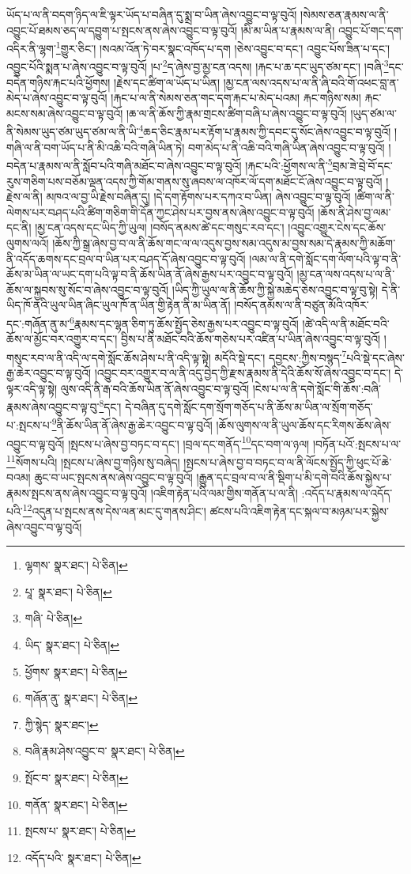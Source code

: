 ཡོད་པ་ལ་ནི་བདག་ཉིད་ལ་ཇི་ལྟར་ཡོད་པ་བཞིན་དུ་སྨྲ་བ་ཡིན་ཞེས་འབྱུང་བ་ལྟ་བུའོ། །སེམས་ཅན་རྣམས་ལ་ནི་འབྱུང་པོ་ཐམས་ཅད་ལ་དབྱུག་པ་སྤངས་ནས་ཞེས་འབྱུང་བ་ལྟ་བུའོ། །མི་མ་ཡིན་པ་རྣམས་ལ་ནི། འབྱུང་པོ་གང་དག་འདིར་ནི་ལྷག་\footnote{ལྷགས་  སྣར་ཐང་།  པེ་ཅིན། }གྱུར་ཅིང་། །སའམ་འོན་ཏེ་བར་སྣང་འཁོད་པ་དག །ཅེས་འབྱུང་བ་དང་། འབྱུང་པོས་ཟིན་པ་དང་། འབྱུང་པོའི་སྨན་པ་ཞེས་འབྱུང་བ་ལྟ་བུའོ། །པ་\footnote{པཱ་  སྣར་ཐང་།  པེ་ཅིན། }ད་ཞེས་བྱ་མྱ་ངན་འདས། །རྐང་པ་ཆ་དང་ཡུད་ཙམ་དང་། །བཞི་\footnote{གཞི་  པེ་ཅིན། }དང་བདེན་གཉིས་རྐང་པའི་ཕྱོགས། །རྗེས་དང་ཚིག་ལ་ཡོད་པ་ཡིན། །མྱ་ངན་ལས་འདས་པ་ལ་ནི་ཞི་བའི་གོ་འཕང་བླ་ན་མེད་པ་ཞེས་འབྱུང་བ་ལྟ་བུའོ། །རྐང་པ་ལ་ནི་སེམས་ཅན་གང་དག་རྐང་པ་མེད་པའམ། རྐང་གཉིས་སམ། རྐང་མངས་སམ་ཞེས་འབྱུང་བ་ལྟ་བུའོ། །ཆ་ལ་ནི་ཆོས་ཀྱི་རྣམ་གྲངས་ཚིག་བཞི་པ་ཞེས་འབྱུང་བ་ལྟ་བུའོ། །ཡུད་ཙམ་ལ་ནི་སེམས་ཡུད་ཙམ་ཡུད་ཙམ་ལ་ནི་ཡི་\footnote{ཡིད་  སྣར་ཐང་།  པེ་ཅིན། }ཆད་ཅིང་རྣམ་པར་རྟོག་པ་རྣམས་ཀྱི་དབང་དུ་སོང་ཞེས་འབྱུང་བ་ལྟ་བུའོ། །གཞི་ལ་ནི་བག་ཡོད་པ་ནི་མི་འཆི་བའི་གཞི་ཡིན་ཏེ། བག་མེད་པ་ནི་འཆི་བའི་གཞི་ཡིན་ཞེས་འབྱུང་བ་ལྟ་བུའོ། །བདེན་པ་རྣམས་ལ་ནི་སློབ་པའི་གཞི་མཐོང་བ་ཞེས་འབྱུང་བ་ལྟ་བུའོ། །རྐང་པའི་:ཕྱོགས་ལ་ནི་\footnote{ཕྱོགས་  སྣར་ཐང་།  པེ་ཅིན། }བྲམ་ཟེ་བྲེ་བོ་དང་རུས་གཅིག་པས་བཅོམ་ལྡན་འདས་ཀྱི་གོམ་གནས་སུ་ཞབས་ལ་འཁོར་ལོ་དག་མཐོང་ངོ་ཞེས་འབྱུང་བ་ལྟ་བུའོ། །རྗེས་ལ་ནི། མཁའ་ལ་བྱ་ཡི་རྗེས་བཞིན་དུ། །དེ་དག་རྟོགས་པར་དཀའ་བ་ཡིན། ཞེས་འབྱུང་བ་ལྟ་བུའོ། །ཚིག་ལ་ནི་ལེགས་པར་བཤད་པའི་ཚིག་གཅིག་གི་དོན་ཀྱང་ཤེས་པར་བྱས་ནས་ཞེས་འབྱུང་བ་ལྟ་བུའོ། །ཆོས་ནི་ཤེས་བྱ་ལམ་དང་ནི། །མྱ་ངན་འདས་དང་ཡིད་ཀྱི་ཡུལ། །བསོད་ནམས་ཚེ་དང་གསུང་རབ་དང་། །འབྱུང་འགྱུར་ངེས་དང་ཆོས་ལུགས་ལའོ། །ཆོས་ཀྱི་སྒྲ་ཞེས་བྱ་བ་ལ་ནི་ཆོས་གང་ལ་ལ་འདུས་བྱས་སམ་འདུས་མ་བྱས་སམ་དེ་རྣམས་ཀྱི་མཆོག་ནི་འདོད་ཆགས་དང་བྲལ་བ་ཡིན་པར་བཤད་དོ་ཞེས་འབྱུང་བ་ལྟ་བུའོ། །ལམ་ལ་ནི་དགེ་སློང་དག་ལོག་པའི་ལྟ་བ་ནི་ཆོས་མ་ཡིན་ལ་ཡང་དག་པའི་ལྟ་བ་ནི་ཆོས་ཡིན་ནོ་ཞེས་རྒྱས་པར་འབྱུང་བ་ལྟ་བུའོ། །མྱ་ངན་ལས་འདས་པ་ལ་ནི་ཆོས་ལ་སྐྱབས་སུ་སོང་བ་ཞེས་འབྱུང་བ་ལྟ་བུའོ། །ཡིད་ཀྱི་ཡུལ་ལ་ནི་ཆོས་ཀྱི་སྐྱེ་མཆེད་ཅེས་འབྱུང་བ་ལྟ་བུ་སྟེ། དེ་ནི་ཡིད་ཁོ་ནའི་ཡུལ་ཡིན་ཞིང་ཡུལ་ཁོ་ན་ཡིན་གྱི་རྟེན་ནི་མ་ཡིན་ནོ། །བསོད་ནམས་ལ་ནི་བཙུན་མོའི་འཁོར་དང་:གཞོན་ནུ་མ་\footnote{གཞོན་ནུ་  སྣར་ཐང་།  པེ་ཅིན། }རྣམས་དང་ལྷན་ཅིག་ཏུ་ཆོས་སྤྱོད་ཅེས་རྒྱས་པར་འབྱུང་བ་ལྟ་བུའོ། །ཚེ་འདི་ལ་ནི་མཐོང་བའི་ཆོས་ལ་མྱོང་བར་འགྱུར་བ་དང་། བྱིས་པ་ནི་མཐོང་བའི་ཆོས་གཅེས་པར་འཛིན་པ་ཡིན་ཞེས་འབྱུང་བ་ལྟ་བུའོ། །གསུང་རབ་ལ་ནི་འདི་ལ་དགེ་སློང་ཆོས་ཤེས་པ་ནི་འདི་ལྟ་སྟེ། མདོའི་སྡེ་དང་། དབྱངས་:ཀྱིས་བསྙད་\footnote{ཀྱི་སྙེད་  སྣར་ཐང་། }པའི་སྡེ་དང་ཞེས་རྒྱ་ཆེར་འབྱུང་བ་ལྟ་བུའོ། །འབྱུང་བར་འགྱུར་བ་ལ་ནི་འདུ་བྱེད་ཀྱི་རྫས་རྣམས་ནི་དེའི་ཆོས་སོ་ཞེས་འབྱུང་བ་དང་། དེ་ལྟར་འདི་ལྟ་སྟེ། ལུས་འདི་ནི་རྒ་བའི་ཆོས་ཡིན་ནོ་ཞེས་འབྱུང་བ་ལྟ་བུའོ། །ངེས་པ་ལ་ནི་དགེ་སློང་གི་ཆོས་:བཞི་རྣམས་ཞེས་འབྱུང་བ་ལྟ་བུ་\footnote{བཞི་རྣམ་ཤེས་འབྱུང་བ་  སྣར་ཐང་།  པེ་ཅིན། }དང་། དེ་བཞིན་དུ་དགེ་སློང་དག་སྲོག་གཅོད་པ་ནི་ཆོས་མ་ཡིན་ལ་སྲོག་གཅོད་པ་:སྤངས་པ་\footnote{སྤོང་བ་  སྣར་ཐང་།  པེ་ཅིན། }ནི་ཆོས་ཡིན་ནོ་ཞེས་རྒྱ་ཆེར་འབྱུང་བ་ལྟ་བུའོ། །ཆོས་ལུགས་ལ་ནི་ཡུལ་ཆོས་དང་རིགས་ཆོས་ཞེས་འབྱུང་བ་ལྟ་བུའོ། །སྤངས་པ་ཞེས་བྱ་བཏང་བ་དང་། །བྲལ་དང་གནོད་\footnote{གནོན་  སྣར་ཐང་།  པེ་ཅིན། }དང་བག་ལ་ཉལ། །བཏོན་པའོ་:སྤངས་པ་ལ་\footnote{སྤངས་པ་  སྣར་ཐང་།  པེ་ཅིན། }སོགས་པའི། །སྤངས་པ་ཞེས་བྱ་གཉིས་སུ་བཞེད། །སྤངས་པ་ཞེས་བྱ་བ་བཏང་བ་ལ་ནི་ལོངས་སྤྱོད་ཀྱི་ཕུང་པོ་ཆེ་བའམ། ཆུང་བ་ཡང་སྤངས་ནས་ཞེས་འབྱུང་བ་ལྟ་བུའོ། །རྒྱུན་དང་བྲལ་བ་ལ་ནི་སྡིག་པ་མི་དགེ་བའི་ཆོས་སྐྱེས་པ་རྣམས་སྤངས་ནས་ཞེས་འབྱུང་བ་ལྟ་བུའོ། །འཇིག་རྟེན་པའི་ལམ་གྱིས་གནོན་པ་ལ་ནི། :འདོད་པ་རྣམས་ལ་འདོད་པའི་\footnote{འདོད་པའི་  སྣར་ཐང་།  པེ་ཅིན། }འདུན་པ་སྤངས་ནས་དེས་ལན་མང་དུ་གནས་ཤིང་། ཚངས་པའི་འཇིག་རྟེན་དང་སྐལ་བ་མཉམ་པར་སྐྱེས་ཞེས་འབྱུང་བ་ལྟ་བུའོ། 
